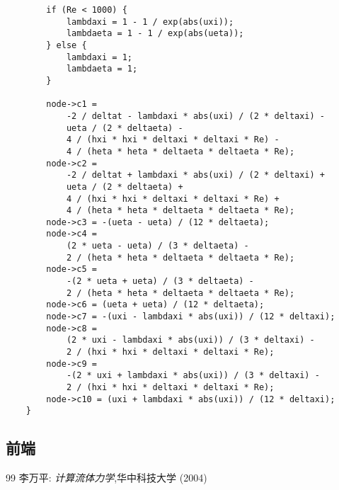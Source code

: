 \documentclass[12pt]{article}
\begin{document}
\begin{lstlisting}
        if (Re < 1000) {
            lambdaxi = 1 - 1 / exp(abs(uxi));
            lambdaeta = 1 - 1 / exp(abs(ueta));
        } else {
            lambdaxi = 1;
            lambdaeta = 1;
        }

        node->c1 =
            -2 / deltat - lambdaxi * abs(uxi) / (2 * deltaxi) -
            ueta / (2 * deltaeta) -
            4 / (hxi * hxi * deltaxi * deltaxi * Re) -
            4 / (heta * heta * deltaeta * deltaeta * Re);
        node->c2 =
            -2 / deltat + lambdaxi * abs(uxi) / (2 * deltaxi) +
            ueta / (2 * deltaeta) +
            4 / (hxi * hxi * deltaxi * deltaxi * Re) +
            4 / (heta * heta * deltaeta * deltaeta * Re);
        node->c3 = -(ueta - ueta) / (12 * deltaeta);
        node->c4 =
            (2 * ueta - ueta) / (3 * deltaeta) -
            2 / (heta * heta * deltaeta * deltaeta * Re);
        node->c5 =
            -(2 * ueta + ueta) / (3 * deltaeta) -
            2 / (heta * heta * deltaeta * deltaeta * Re);
        node->c6 = (ueta + ueta) / (12 * deltaeta);
        node->c7 = -(uxi - lambdaxi * abs(uxi)) / (12 * deltaxi);
        node->c8 =
            (2 * uxi - lambdaxi * abs(uxi)) / (3 * deltaxi) -
            2 / (hxi * hxi * deltaxi * deltaxi * Re);
        node->c9 =
            -(2 * uxi + lambdaxi * abs(uxi)) / (3 * deltaxi) -
            2 / (hxi * hxi * deltaxi * deltaxi * Re);
        node->c10 = (uxi + lambdaxi * abs(uxi)) / (12 * deltaxi);
    }
\end{lstlisting}
\subsection{前端}



\begin{thebibliography}
{99}
  李万平: 
 \emph{计算流体力学},华中科技大学 
(2004)
  \end{thebibliography}
\end{document}
